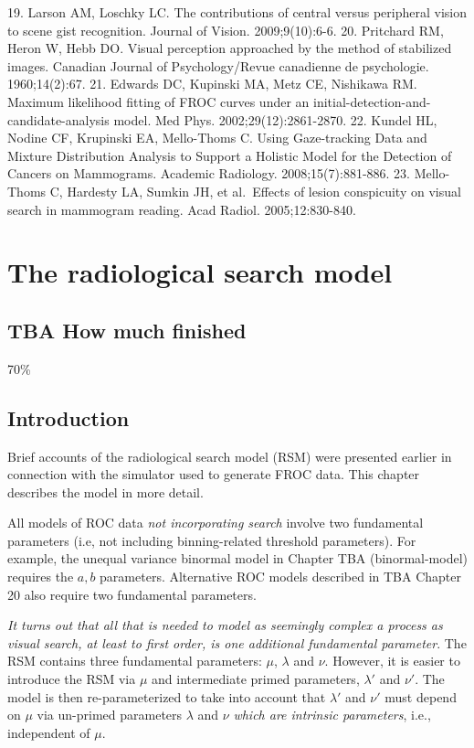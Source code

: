 \documentclass[
]{book}
\begin{document}
19. Larson AM, Loschky LC. The contributions of central versus peripheral vision to scene gist recognition. Journal of Vision. 2009;9(10):6-6.
20. Pritchard RM, Heron W, Hebb DO. Visual perception approached by the method of stabilized images. Canadian Journal of Psychology/Revue canadienne de psychologie. 1960;14(2):67.
21. Edwards DC, Kupinski MA, Metz CE, Nishikawa RM. Maximum likelihood fitting of FROC curves under an initial-detection-and-candidate-analysis model. Med Phys. 2002;29(12):2861-2870.
22. Kundel HL, Nodine CF, Krupinski EA, Mello-Thoms C. Using Gaze-tracking Data and Mixture Distribution Analysis to Support a Holistic Model for the Detection of Cancers on Mammograms. Academic Radiology. 2008;15(7):881-886.
23. Mello-Thoms C, Hardesty LA, Sumkin JH, et al.~Effects of lesion conspicuity on visual search in mammogram reading. Acad Radiol. 2005;12:830-840.

\hypertarget{rsm}{%
\chapter{The radiological search model}\label{rsm}}

\hypertarget{rsm-how-much-finished}{%
\section{TBA How much finished}\label{rsm-how-much-finished}}

70\%

\hypertarget{rsm-intro}{%
\section{Introduction}\label{rsm-intro}}

Brief accounts of the radiological search model (RSM) were presented earlier in connection with the simulator used to generate FROC data. This chapter describes the model in more detail.

All models of ROC data \emph{not incorporating search} involve two fundamental parameters (i.e, not including binning-related threshold parameters). For example, the unequal variance binormal model in Chapter TBA (binormal-model) requires the \(a,b\) parameters. Alternative ROC models described in TBA Chapter 20 also require two fundamental parameters.

\emph{It turns out that all that is needed to model as seemingly complex a process as visual search, at least to first order, is one additional fundamental parameter}. The RSM contains three fundamental parameters: \(\mu\), \(\lambda\) and \(\nu\). However, it is easier to introduce the RSM via \(\mu\) and intermediate primed parameters, \(\lambda'\) and \(\nu'\). The model is then re-parameterized to take into account that \(\lambda'\) and \(\nu'\) must depend on \(\mu\) via un-primed parameters \(\lambda\) and \(\nu\) \emph{which are intrinsic parameters}, i.e., independent of \(\mu\).
\end{document}

